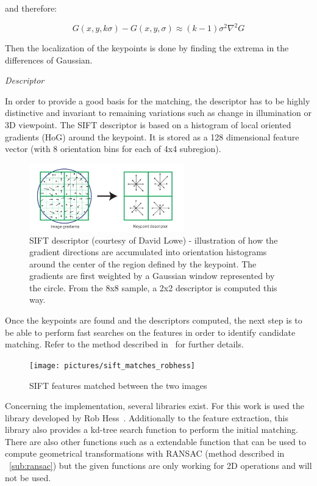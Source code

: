 and therefore:

\[ G(x,y,k\sigma) - G(x,y,\sigma) \approx (k-1)\sigma^2\nabla^2G \]

Then the localization of the keypoints is done by finding the extrema in the differences of Gaussian. 


\emph{Descriptor}

In order to provide a good basis for the matching, the descriptor has to be highly distinctive and invariant to remaining variations such as change in illumination or 3D viewpoint. The SIFT descriptor is based on a histogram of local oriented gradients (HoG) around the keypoint. It is stored as a 128 dimensional feature vector (with 8 orientation bins for each of 4x4 subregion).

\begin{figure}[H]
\centering
\includegraphics[width=0.6\textwidth]{figures/sift_descriptor}
\caption{SIFT descriptor (courtesy of David Lowe) - illustration of how the gradient directions are accumulated into orientation histograms around the center of the region defined by the keypoint. The gradients are first weighted by a Gaussian window represented by the circle. From the 8x8 sample, a 2x2 descriptor is computed this way.}
\end{figure}

Once the keypoints are found and the descriptors computed, the next step is to be able to perform fast searches on the features in order to identify candidate matching. Refer to the method described in~\cite{lowe_2004_sift} for further details.

\begin{figure}[H]
\centering
\texttt{[image: pictures/sift\_matches\_robhess]}
\caption{SIFT features matched between the two images}
\end{figure}

Concerning the implementation, several libraries exist. For this work is used the library developed by Rob Hess~\cite{hess_sift}. Additionally to the feature extraction, this library also provides a kd-tree search function to perform the initial matching. There are also other functions such as a extendable function that can be used to compute geometrical transformations with RANSAC (method described in ~\ref{sub:ransac}) but the given functions are only working for 2D operations and will not be used.

